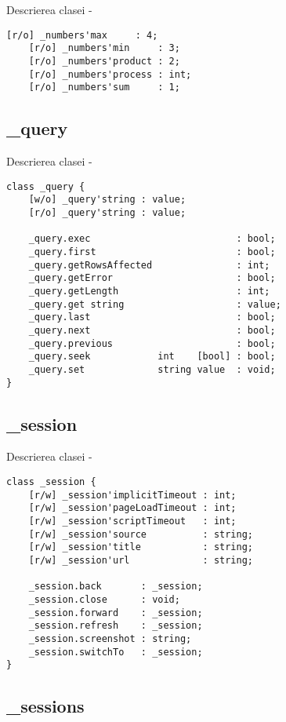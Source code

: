 \noindent Descrierea clasei  -
\begin{lstlisting}[numbers=none]
	[r/o] _numbers'max     : 4;
	[r/o] _numbers'min     : 3;
	[r/o] _numbers'product : 2;
	[r/o] _numbers'process : int;
	[r/o] _numbers'sum     : 1;
\end{lstlisting}

\subsection{{\color{orange} \_query}}

\noindent Descrierea clasei  -
\begin{lstlisting}[numbers=none]
class _query {
	[w/o] _query'string : value;
	[r/o] _query'string : value;
	
	_query.exec                          : bool;
	_query.first                         : bool;
	_query.getRowsAffected               : int;
	_query.getError                      : bool;
	_query.getLength                     : int;
	_query.get string                    : value;
	_query.last                          : bool;
	_query.next                          : bool;
	_query.previous                      : bool;
	_query.seek            int    [bool] : bool;
	_query.set             string value  : void;
}
\end{lstlisting}

\subsection{{\color{orange} \_session}}

\noindent Descrierea clasei  -
\begin{lstlisting}[numbers=none]
class _session {
	[r/w] _session'implicitTimeout : int;
	[r/w] _session'pageLoadTimeout : int;
	[r/w] _session'scriptTimeout   : int;
	[r/w] _session'source          : string;
	[r/w] _session'title           : string;
	[r/w] _session'url             : string;
	
	_session.back       : _session;
	_session.close      : void;
	_session.forward    : _session;
	_session.refresh    : _session;
	_session.screenshot : string;
	_session.switchTo   : _session;
}
\end{lstlisting}

\subsection{{\color{orange} \_sessions}}

